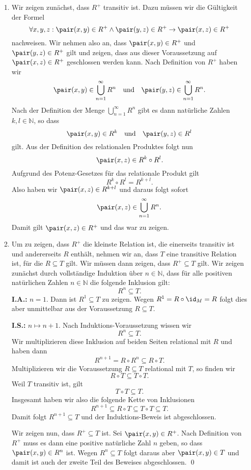 \begin{enumerate}
\item Wir zeigen zun\"{a}chst, dass $R^+$ transitiv ist. Dazu m\"{u}ssen wir die G\"{u}ltigkeit der Formel
      \[ \forall x, y, z: \pair(x,y) \in R^+ \wedge \pair(y,z) \in R^+ \rightarrow \pair(x,z) \in R^+ \]
nachweisen.  Wir nehmen also an, dass $\pair(x,y) \in R^+$ und $\pair(y,z) \in R^+$
gilt und zeigen, dass aus dieser Voraussetzung auf $\pair(x,z) \in R^+$ geschlossen
werden kann.  Nach Definition von $R^+$ haben wir 
\[ \pair(x,y) \in \bigcup\limits_{n=1}^{\infty} R^n \quad \mbox{und} \quad
   \pair(y,z) \in \bigcup\limits_{n=1}^{\infty} R^n.
\]
Nach der Definition der Menge $\bigcup\limits_{n=1}^{\infty} R^n$ gibt es dann nat\"{u}rliche Zahlen $k,l\in\mathbb{N}$, so dass
\[ \pair(x,y) \in R^k \quad \mbox{und} \quad \pair(y,z) \in R^l \]
gilt.  Aus der Definition des relationalen Produktes folgt nun
\[  \pair(x,z) \in R^k \circ R^l. \]
Aufgrund des Potenz-Gesetzes f\"{u}r das relationale Produkt gilt 
\[ R^k \circ R^l = R^{k+l}. \]
Also haben wir $\pair(x,z) \in R^{k+l}$ und daraus folgt sofort
\[  \pair(x,z) \in \bigcup\limits_{n=1}^{\infty} R^n. \]
Damit gilt $\pair(x,z) \in R^+$ und das war zu zeigen. 

\item 
Um zu zeigen, dass $R^+$ die kleinste Relation ist, die einerseits transitiv ist
und andererseits $R$ enth\"{a}lt, nehmen wir an, dass $T$ eine transitive Relation ist,
f\"{u}r die $R \subseteq T$ gilt.  Wir m\"{u}ssen dann zeigen, dass $R^+ \subseteq T$ gilt.
Wir zeigen zun\"{a}chst durch vollst\"{a}ndige Induktion \"{u}ber $n\in\mathbb{N}$, dass f\"{u}r alle positiven
nat\"{u}rlichen Zahlen $n\in\mathbb{N}$ die folgende Inklusion gilt:
\[ R^n \subseteq T. \]
\noindent
\textbf{I.A.:} $n=1$.  Dann ist $R^1 \subseteq T$ zu zeigen.  Wegen
 $R^1 = R \circ \id_M = R$
 folgt dies aber unmittelbar aus der Voraussetzung $R \subseteq T$.
\vspace*{0.1cm}

\noindent
\textbf{I.S.:} $n \mapsto n+1$.  Nach Induktions-Voraussetzung wissen wir
              \[ R^n \subseteq T. \]
             Wir multiplizieren diese Inklusion auf beiden Seiten relational mit $R$
             und haben dann
             \[ R^{n+1} = R \circ R^n \subseteq R \circ T. \]
             Multiplizieren wir die Voraussetzung $R \subseteq T$ relational mit
             $T$, so finden wir
             \[ R \circ T \subseteq T \circ T. \]
             Weil $T$ transitiv ist, gilt 
             \[ T \circ T \subseteq T. \]
             Insgesamt haben wir also die folgende Kette von Inklusionen
             \[ R^{n+1} \subseteq R \circ T \subseteq T \circ T \subseteq T. \]
             Damit folgt $R^{n+1} \subseteq T$ und der Induktions-Beweis ist
             abgeschlossen.
\vspace*{0.1cm}

\noindent
Wir zeigen nun, dass $R^+ \subseteq T$ ist.  Sei $\pair(x,y) \in R^+$.
Nach Definition von $R^+$ muss es dann eine positive nat\"{u}rliche Zahl $n$ geben, so
dass $\pair(x,y) \in R^n$ ist.  Wegen $R^n \subseteq T$ folgt daraus aber
$\pair(x,y) \in T$ und damit ist auch der zweite Teil des Beweises abgeschlossen. \qed
\end{enumerate}

